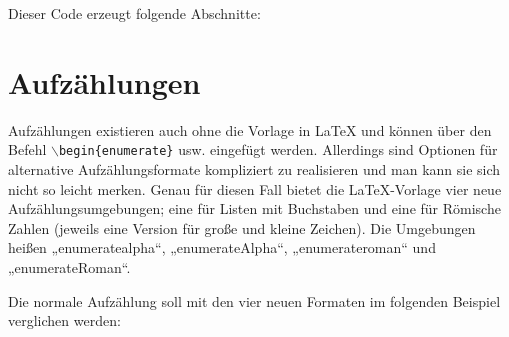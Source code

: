 			Dieser Code erzeugt folgende Abschnitte: 
			
			\newline
			
		\section{Aufzählungen}
		
			Aufzählungen existieren auch ohne die Vorlage in \LaTeX{} und können \zb über den Befehl \texttt{$\backslash$begin\{enumerate\}} usw. eingefügt werden. Allerdings sind Optionen für alternative Aufzählungsformate kompliziert zu realisieren und man kann sie sich nicht so leicht merken. Genau für diesen Fall bietet die \LaTeX{}-Vorlage vier neue Aufzählungsumgebungen; eine für Listen mit Buchstaben und eine für Römische Zahlen (jeweils eine Version für große und kleine Zeichen). Die Umgebungen heißen „enumeratealpha“, „enumerateAlpha“, „enumerateroman“ und „enumerateRoman“.
			
			Die normale Aufzählung soll mit den vier neuen Formaten im folgenden Beispiel verglichen werden: 
			
